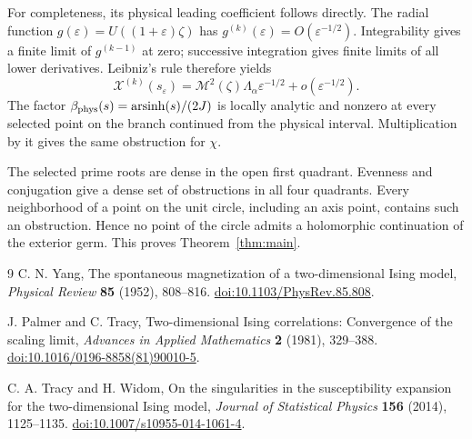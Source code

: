 \documentclass[11pt]{article}
\numberwithin{equation}{section}
\theoremstyle{remark}\newtheorem{remark}[theorem]{Remark}
\newcommand{\X}{\mathcal X}
\newcommand{\Mtwo}{\mathcal M^2}
\begin{document}
For completeness, its physical leading coefficient follows directly.
The radial function $g(\varepsilon)=U((1+\varepsilon)\zeta)$
has $g^{(k)}(\varepsilon)=O(\varepsilon^{-1/2})$.
Integrability gives a finite limit of $g^{(k-1)}$ at zero;
successive integration gives finite limits of all lower derivatives.
Leibniz's rule therefore yields
\[
 \X^{(k)}(s_\varepsilon)
     =\Mtwo(\zeta)\Lambda_\alpha\varepsilon^{-1/2}
                             +o(\varepsilon^{-1/2}).
\]
The factor $\beta_{\rm phys}(s)=\operatorname{arsinh}(s)/(2J)$
is locally analytic and nonzero at every selected point on the
branch continued from the physical interval. Multiplication by it
gives the same obstruction for $\chi$.

The selected prime roots are dense in the open first quadrant.
Evenness and conjugation give a dense set of obstructions in all
four quadrants. Every neighborhood of a point on the unit circle,
including an axis point, contains such an obstruction. Hence no
point of the circle admits a holomorphic continuation of the
exterior germ. This proves Theorem~\ref{thm:main}.

\begin{thebibliography}{9}
C. N. Yang, The spontaneous magnetization of a two-dimensional
Ising model, \emph{Physical Review} \textbf{85} (1952), 808--816.
\href{https://doi.org/10.1103/PhysRev.85.808}{doi:10.1103/PhysRev.85.808}.

J. Palmer and C. Tracy, Two-dimensional Ising correlations:
Convergence of the scaling limit, \emph{Advances in Applied
Mathematics} \textbf{2} (1981), 329--388.
\href{https://doi.org/10.1016/0196-8858(81)90010-5}{doi:10.1016/0196-8858(81)90010-5}.

C. A. Tracy and H. Widom, On the singularities in the susceptibility
expansion for the two-dimensional Ising model,
\emph{Journal of Statistical Physics} \textbf{156} (2014), 1125--1135.
\href{https://doi.org/10.1007/s10955-014-1061-4}{doi:10.1007/s10955-014-1061-4}.

\end{thebibliography}
\end{document}
